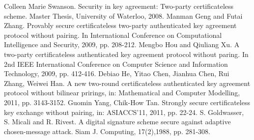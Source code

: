 \documentclass[final,1p,times,twocolumn]{elsarticle}
\begin{document}
\begin{thebibliography}{99}
 Colleen Marie Swanson. Security in key agreement: Two-party certificateless scheme. Master Thesis, University of Waterloo, 2008.
 Manman Geng and Futai Zhang. Provably secure certificateless two-party authenticated key agreement protocol without pairing. In International Conference on Computational Intelligence and Security, 2009, pp. 208-212.
 Mengbo Hou and Qiuliang Xu. A two-party certificateless authenticated key agreement protocol without paring. In 2nd IEEE International Conference on Computer Science and Information Technology, 2009, pp. 412-416.
 Debiao He, Yitao Chen, Jianhua Chen, Rui Zhang, Weiwei Han. A new two-round certificateless authenticated key agreement protocol without bilinear prirings, in: Mathematical and Computer Modelling, 2011, pp. 3143-3152.
 Guomin Yang, Chik-How Tan. Strongly secure certificateless key exchange without pairing, in: ASIACCS'11, 2011, pp. 22-24.
 S. Goldwasser, S. Micali and R. Rivest. A digital signature scheme secure against adaptive chosen-message attack. Siam J. Computing, 17(2),1988, pp. 281-308.

\end{thebibliography}
\end{document}
